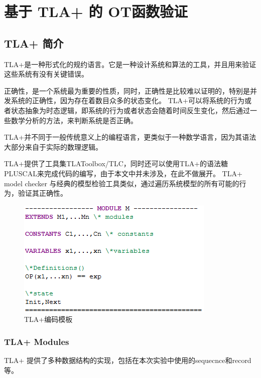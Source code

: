 \chapter{基于 TLA+ 的 OT函数验证} 
\label{chapter:proof}
\section{TLA+ 简介}
\par TLA+是一种形式化的规约语言。它是一种设计系统和算法的工具，并且用来验证这些系统有没有关键错误。
\par 正确性，是一个系统最为重要的性质，同时，正确性是比较难以证明的，特别是并发系统的正确性，因为存在着数目众多的状态变化。
TLA+可以将系统的行为或者状态抽象为时态逻辑，即系统的行为或者状态会随着时间反生变化，然后通过一些数学分析的方法，来判断系统是否正确。

\par TLA+并不同于一般传统意义上的编程语言，更类似于一种数学语言，因为其语法大部分来自于实际的数理逻辑。
\par TLA+提供了工具集TLAToolbox/TLC，同时还可以使用TLA+的语法糖PLUSCAL来完成代码的编写，由于本文中并未涉及，在此不做展开。
TLA+ model checker 与经典的模型检验工具类似，通过遍历系统模型的所有可能的行为，验证其正确性。

\begin{figure}[H]
\centering
\includegraphics{figures/module.png}
\caption{TLA+编码模板}
\label{fig:graph}
\end{figure}

\subsection{TLA+ Modules}
TLA+ 提供了多种数据结构的实现，包括在本次实验中使用的sequecnce和record等。

